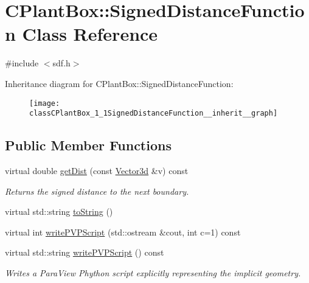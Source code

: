 \hypertarget{classCPlantBox_1_1SignedDistanceFunction}{}\section{C\+Plant\+Box\+:\+:Signed\+Distance\+Function Class Reference}
\label{classCPlantBox_1_1SignedDistanceFunction}


{\ttfamily \#include $<$sdf.\+h$>$}



Inheritance diagram for C\+Plant\+Box\+:\+:Signed\+Distance\+Function\+:\nopagebreak
\begin{figure}[H]
\begin{center}
\leavevmode
\texttt{[image: classCPlantBox\_1\_1SignedDistanceFunction\_\_inherit\_\_graph]}
\end{center}
\end{figure}
\subsection*{Public Member Functions}
\begin{DoxyCompactItemize}
\item 
virtual double \hyperlink{classCPlantBox_1_1SignedDistanceFunction_a8e58237574af3673906bba84d5d14ee8}{get\+Dist} (const \hyperlink{classCPlantBox_1_1Vector3d}{Vector3d} \&v) const
\begin{DoxyCompactList}\small\item\em Returns the signed distance to the next boundary. \end{DoxyCompactList}\item 
virtual std\+::string \hyperlink{classCPlantBox_1_1SignedDistanceFunction_a9f375961d9a24b06dc669ac67aa16fa6}{to\+String} ()
\item 
virtual int \hyperlink{classCPlantBox_1_1SignedDistanceFunction_a0098fb469c9be5557d5593cec9e76d2a}{write\+P\+V\+P\+Script} (std\+::ostream \&cout, int c=1) const
\item 
virtual std\+::string \hyperlink{classCPlantBox_1_1SignedDistanceFunction_a4b7fe3a943e52f35b0e27187edcef640}{write\+P\+V\+P\+Script} () const
\begin{DoxyCompactList}\small\item\em Writes a Para\+View Phython script explicitly representing the implicit geometry. \end{DoxyCompactList}\end{DoxyCompactItemize}


